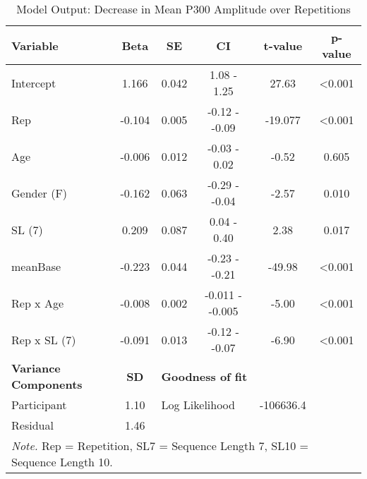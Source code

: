 \begin{table}[H]
\centering
\begin{tabular}{lccccc}
\hline
\textbf{Variable}            & \textbf{Beta} & \textbf{SE}          & \textbf{CI}           & \textbf{t-value} & \textbf{p-value} \\ \hline
Intercept                    & 1.166         & 0.042                & 1.08 - 1.25           & 27.63            & \textless{}0.001 \\
Rep                          & -0.104         & 0.005                & -0.12 - -0.09           & -19.077          & \textless{}0.001 \\
Age                          & -0.006         & 0.012                & -0.03 - 0.02           & -0.52             & 0.605 \\
Gender (F)                 &-0.162      & 0.063                & -0.29 - -0.04           & -2.57            & 0.010 \\
SL (7)                       & 0.209         & 0.087                & 0.04 - 0.40           & 2.38             & 0.017 \\
meanBase                 & -0.223         & 0.044                & -0.23 - -0.21           & -49.98             & \textless{}0.001 \\
Rep x Age                    & -0.008         & 0.002                & -0.011 - -0.005         & -5.00             & \textless{}0.001 \\
Rep x SL (7)                 & -0.091         & 0.013                & -0.12 - -0.07         & -6.90             & \textless{}0.001            \\ \hline
\textbf{Variance Components} & \textbf{SD}   & \multicolumn{2}{l}{\textbf{Goodness of fit}} & \textbf{}        & \textbf{}        \\ \hline
Participant                  & 1.10          & \multicolumn{2}{l}{Log Likelihood}           & -106636.4         &                  \\

Residual                     & 1.46          &                      &                       &                  &                  \\ \hline
\multicolumn{6}{l}{\small \textit{Note.} Rep = Repetition, SL7 = Sequence Length 7, SL10 = Sequence Length 10.}\\

\end{tabular}
\caption{Model Output: Decrease in Mean P300 Amplitude over Repetitions}
\label{tab:my_label}
\end{table}
